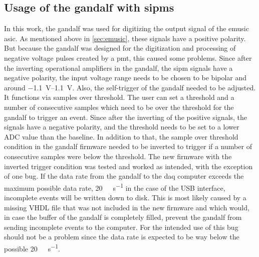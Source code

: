\subsection{Usage of the \ac{gandalf} with \acp{sipm}}
In this work, the \ac{gandalf} was used for digitizing the output signal of the \ac{emusic} \ac{asic}.
As mentioned above in \autoref{sec:emusic}, these signals have a positive polarity.
But because the \ac{gandalf} was designed for the digitization and processing of negative voltage pulses created by a \ac{pmt}, this caused some problems.
Since after the inverting operational amplifiers in the \ac{gandalf}, the \ac{sipm} signals have a negative polarity, the input voltage range needs to be chosen to be bipolar and around \SIrange{-1.1}{1.1}{\volt}.
Also, the self-trigger of the \ac{gandalf} needed to be adjusted.
It functions via samples over threshold.
The user can set a threshold and a number of consecutive samples which need to be over the threshold for the \ac{gandalf} to trigger an event.
Since after the inverting of the positive signals, the signals have a negative polarity, and the threshold needs to be set to a lower ADC value than the baseline.
In addition to that, the sample over threshold condition in the \ac{gandalf} firmware needed to be inverted to trigger if a number of consecutive samples were below the threshold.
The new firmware with the inverted trigger condition was tested and worked as intended, with the exception of one bug.
If the data rate from the \ac{gandalf} to the \ac{daq} computer exceeds the maximum possible data rate, \SI{20}{\mega\byte\per\second} in the case of the USB interface, incomplete events will be written down to disk.
This is most likely caused by a missing VHDL file that was not included in the new firmware and which would, in case the buffer of the \ac{gandalf} is completely filled, prevent the \ac{gandalf} from sending incomplete events to the computer.
For the intended use of this bug should not be a problem since the data rate is expected to be way below the possible \SI{20}{\mega\byte\per\second}.
